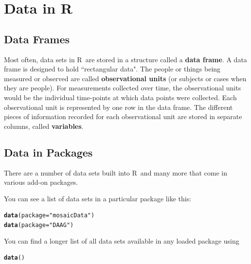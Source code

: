 \documentclass[twoside]{book}\usepackage[]{graphicx}\usepackage[]{xcolor}
\makeatletter
\newcommand{\hlstr}[1]{\textcolor[rgb]{0.192,0.494,0.8}{#1}}%
\newcommand{\hlstd}[1]{\textcolor[rgb]{0.345,0.345,0.345}{#1}}%
\newcommand{\hlkwc}[1]{\textcolor[rgb]{0.333,0.667,0.333}{#1}}%
\newcommand{\hlkwd}[1]{\textcolor[rgb]{0.737,0.353,0.396}{\textbf{#1}}}%
\newenvironment{kframe}{%
 \def\at@end@of@kframe{}%
 \ifinner\ifhmode%
  \def\at@end@of@kframe{\end{minipage}}%
  \begin{minipage}{\columnwidth}%
 \fi\fi%
 \def\FrameCommand##1{\hskip\@totalleftmargin \hskip-\fboxsep
 \colorbox{shadecolor}{##1}\hskip-\fboxsep
     \hskip-\linewidth \hskip-\@totalleftmargin \hskip\columnwidth}%
 \MakeFramed {\advance\hsize-\width
   \@totalleftmargin\z@ \linewidth\hsize
   \@setminipage}}%
 {\par\unskip\endMakeFramed%
 \at@end@of@kframe}
\newenvironment{knitrout}{}{} %
\def\R{{\sf R}}
\def\term#1{\textbf{#1}}
\makeatother
\begin{document}
\section{Data in \R}

\subsection{Data Frames}
Most often, data sets in \R\ are stored in a structure called a 
\term{data frame}.  A data frame is designed to hold ``rectangular data".  The people or things
being measured or observed are called \term{observational units} (or subjects or cases when 
they are people).  For measurements collected over time, the observational units would be the individual 
time-points at which data points were collected. Each observational unit is represented by one row in the data frame.
The different pieces of information recorded for each observational unit are stored in
separate columns, called \term{variables}.  

\subsection{Data in Packages}
There are a number of data sets built into \R\
and many more that come in various add-on packages.  

You can see a list of data sets in a particular package like this:
\begin{knitrout}
\color{fgcolor}\begin{kframe}
\begin{alltt}
\hlkwd{data}\hlstd{(}\hlkwc{package} \hlstd{=} \hlstr{"mosaicData"}\hlstd{)}
\hlkwd{data}\hlstd{(}\hlkwc{package} \hlstd{=} \hlstr{"DAAG"}\hlstd{)}
\end{alltt}
\end{kframe}
\end{knitrout}

You can find a longer list of all data sets available in any loaded package
using 
\begin{knitrout}
\color{fgcolor}\begin{kframe}
\begin{alltt}
\hlkwd{data}\hlstd{()}
\end{alltt}
\end{kframe}
\end{knitrout}
\end{document}
